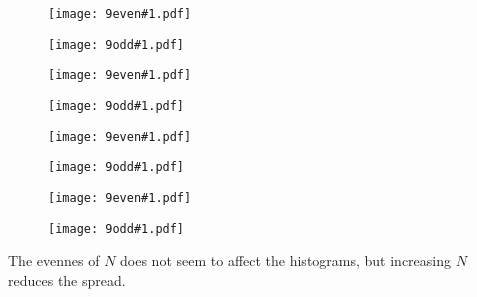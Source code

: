 \newcommand{\ninefig}[1]{
\begin{figure}[!ht]
\centering
  \begin{minipage}[b]{0.24\textwidth}
    \texttt{[image: 9even\#1.pdf]}
  \end{minipage} \begin{minipage}[b]{0.24\textwidth}
    \texttt{[image: 9odd\#1.pdf]}
  \end{minipage}
\end{figure}
}

\ninefig{14}
\ninefig{36}
\ninefig{200}
\ninefig{10000}

The evennes of $N$ does not seem to affect the histograms, but increasing $N$ reduces the spread.